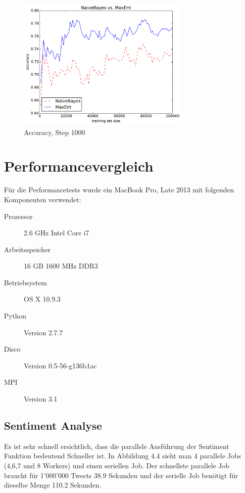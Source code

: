 \documentclass[12pt, oneside]{report}   	%
\begin{document}
\begin{figure}[htbp]
\begin{center}
\includegraphics[width=0.75\textwidth]{bilder/cmp_nb_vs_me_S1000_M100000.pdf}
\caption{Accuracy, Step 1000}
\label{img:acc3}
\end{center}
\end{figure}


\section{Performancevergleich}
Für die Performancetests wurde ein MacBook Pro, Late 2013 mit folgenden Komponenten verwendet:
\begin{description}
\item[ Prozessor] 2.6 GHz Intel Core i7
\item[ Arbeitsspeicher] 16 GB 1600 MHz DDR3
\item[ Betriebsystem] OS X 10.9.3
\item[ Python] Version 2.7.7
\item[ Disco ] Version 0.5-56-g136b1ac
\item[ MPI ] Version 3.1
\end{description}

\subsection{Sentiment Analyse}
Es ist sehr schnell ersichtlich, dass die parallele Ausführung der Sentiment Funktion bedeutend Schneller ist. In Abbildung 4.4 sieht man 4 parallele Jobs (4,6,7 und 8 Workers) und einen seriellen Job. Der schnellste parallele Job braucht für 1'000'000 Tweets 38.9 Sekunden und der serielle Job benötigt für dieselbe Menge 110.2 Sekunden. 
\end{document}
